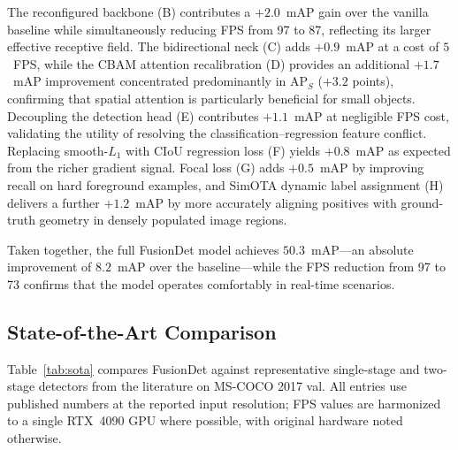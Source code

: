 The reconfigured backbone (B) contributes a $+2.0$~mAP gain
over the vanilla baseline while simultaneously reducing FPS
from 97 to 87, reflecting its larger effective receptive field.
The bidirectional neck (C) adds $+0.9$~mAP at a cost of
$5$~FPS, while the CBAM attention recalibration (D) provides
an additional $+1.7$~mAP improvement concentrated predominantly
in $\text{AP}_S$ ($+3.2$ points), confirming that spatial
attention is particularly beneficial for small objects.
Decoupling the detection head (E) contributes $+1.1$~mAP at
negligible FPS cost, validating the utility of resolving the
classification--regression feature conflict.  Replacing
smooth-$L_1$ with CIoU regression loss (F) yields $+0.8$~mAP
as expected from the richer gradient signal.  Focal loss (G)
adds $+0.5$~mAP by improving recall on hard foreground
examples, and SimOTA dynamic label assignment (H) delivers a
further $+1.2$~mAP by more accurately aligning positives with
ground-truth geometry in densely populated image regions.

Taken together, the full FusionDet model achieves
$50.3$~mAP---an absolute improvement of $8.2$~mAP over the
baseline---while the FPS reduction from 97 to 73 confirms that
the model operates comfortably in real-time scenarios.

\subsection{State-of-the-Art Comparison}

Table~\ref{tab:sota} compares FusionDet against representative
single-stage and two-stage detectors from the literature on
MS-COCO 2017 val.  All entries use published numbers at the
reported input resolution; FPS values are harmonized to a
single RTX~4090 GPU where possible, with original hardware
noted otherwise.

